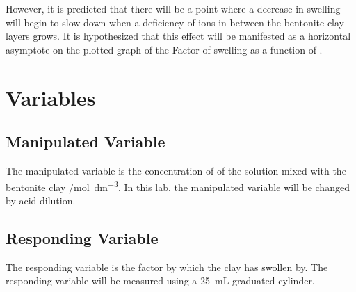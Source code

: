 \documentclass[11pt, letterpaper]{article}
\begin{document}
However, it is predicted that there will be a point where
a decrease in swelling will begin to slow down when a deficiency
of  ions in between the bentonite clay layers grows.
It is hypothesized that this effect will be manifested
as a horizontal asymptote on the plotted graph of the Factor
of swelling as a function of \ce{[H+]}.

\section{Variables}

\begin{paracol}{2}
    \subsection{Manipulated Variable}
    The manipulated variable is the concentration of  of the solution mixed with the
    bentonite clay /\unit{mol.dm^{-3}}. In this lab, the manipulated variable will be
    changed by acid dilution.
    \switchcolumn
    \subsection{Responding Variable}
    The responding variable is the factor by which the clay has swollen by.
    The responding variable will be measured using a \SI{25}{mL} graduated cylinder.

\end{paracol}
\end{document}

